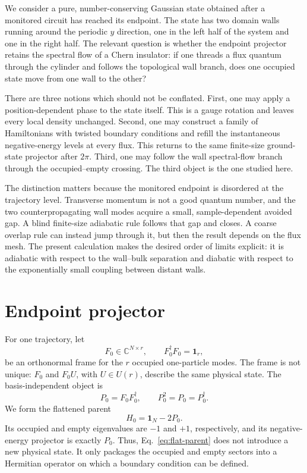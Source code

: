 \documentclass[aps,prb,twocolumn,floatfix,nofootinbib,superscriptaddress]{revtex4-2}
\begin{document}
We consider a pure, number-conserving Gaussian state obtained after a
monitored circuit has reached its endpoint.  The state has two domain walls
running around the periodic $y$ direction, one in the left half of the
system and one in the right half.  The relevant question is whether the
endpoint projector retains the spectral flow of a Chern insulator: if one
threads a flux quantum through the cylinder and follows the topological wall
branch, does one occupied state move from one wall to the other?

There are three notions which should not be conflated.  First, one may apply
a position-dependent phase to the state itself.  This is a gauge rotation
and leaves every local density unchanged.  Second, one may construct a
family of Hamiltonians with twisted boundary conditions and refill the
instantaneous negative-energy levels at every flux.  This returns to the
same finite-size ground-state projector after $2\pi$.  Third, one may follow
the wall spectral-flow branch through the occupied--empty crossing.  The
third object is the one studied here.

The distinction matters because the monitored endpoint is disordered at the
trajectory level.  Transverse momentum is not a good quantum number, and the
two counterpropagating wall modes acquire a small, sample-dependent avoided
gap.  A blind finite-size adiabatic rule follows that gap and closes.  A
coarse overlap rule can instead jump through it, but then the result depends
on the flux mesh.  The present calculation makes the desired order of limits
explicit: it is adiabatic with respect to the wall--bulk separation and
diabatic with respect to the exponentially small coupling between distant
walls.

\section{Endpoint projector}

For one trajectory, let
\begin{equation}
 F_0\in\mathbb C^{N\times r},\qquad
 F_0^\dagger F_0=\mathbf{1}_r,
 \label{eq:frame}
\end{equation}
be an orthonormal frame for the $r$ occupied one-particle modes.  The frame
is not unique: $F_0$ and $F_0U$, with $U\in U(r)$, describe the same physical
state.  The basis-independent object is
\begin{equation}
 P_0=F_0F_0^\dagger,\qquad P_0^2=P_0=P_0^\dagger .
 \label{eq:projector}
\end{equation}
We form the flattened parent
\begin{equation}
 H_0=\mathbf{1}_N-2P_0 .
 \label{eq:flat-parent}
\end{equation}
Its occupied and empty eigenvalues are $-1$ and $+1$, respectively, and its
negative-energy projector is exactly $P_0$.  Thus, Eq.~\eqref{eq:flat-parent}
does not introduce a new physical state.  It only packages the occupied and
empty sectors into a Hermitian operator on which a boundary condition can be
defined.
\end{document}

